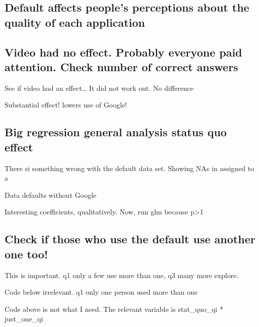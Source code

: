 \documentclass[
  11pt,
]{article}
\begin{document}
\hypertarget{default-affects-peoples-perceptions-about-the-quality-of-each-application}{%
\subsection{Default affects people's perceptions about the quality of each application}\label{default-affects-peoples-perceptions-about-the-quality-of-each-application}}

\hypertarget{video-had-no-effect.-probably-everyone-paid-attention.-check-number-of-correct-answers}{%
\subsection{Video had no effect. Probably everyone paid attention. Check number of correct answers}\label{video-had-no-effect.-probably-everyone-paid-attention.-check-number-of-correct-answers}}

See if video had an effect\ldots{} It did not work out. No difference

Substantial effect! lowers use of Google!

\hypertarget{big-regression-general-analysis-status-quo-effect}{%
\subsection{Big regression general analysis status quo effect}\label{big-regression-general-analysis-status-quo-effect}}

There si something wrong with the default data set. Showing NAs in assigned to a

Data defaults without Google

Interesting coefficients, qualitatively. Now, run glm because p\textgreater1

\hypertarget{check-if-those-who-use-the-default-use-another-one-too}{%
\subsection{Check if those who use the default use another one too!}\label{check-if-those-who-use-the-default-use-another-one-too}}

This is important. q1 only a few use more than one, q3 many more explore.

Code below irrelevant. q1 only one person used more than one

Code above is not what I need. The relevant variable is stat\_quo\_qi * just\_one\_qi
\end{document}
